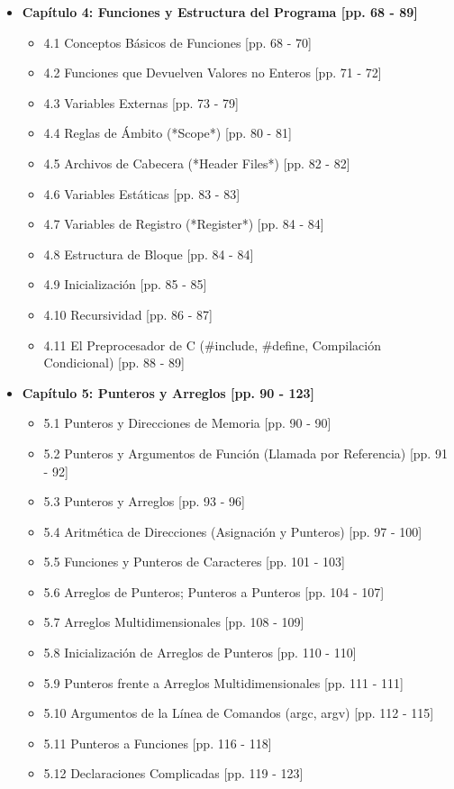 \documentclass[11pt,a4paper]{article}
\begin{document}
\begin{itemize}
    \item \textbf{Capítulo 4: Funciones y Estructura del Programa [pp. 68 - 89]}
    \begin{itemize}
        \item 4.1 Conceptos Básicos de Funciones [pp. 68 - 70]
        \item 4.2 Funciones que Devuelven Valores no Enteros [pp. 71 - 72]
        \item 4.3 Variables Externas [pp. 73 - 79]
        \item 4.4 Reglas de Ámbito (*Scope*) [pp. 80 - 81]
        \item 4.5 Archivos de Cabecera (*Header Files*) [pp. 82 - 82]
        \item 4.6 Variables Estáticas [pp. 83 - 83]
        \item 4.7 Variables de Registro (*Register*) [pp. 84 - 84]
        \item 4.8 Estructura de Bloque [pp. 84 - 84]
        \item 4.9 Inicialización [pp. 85 - 85]
        \item 4.10 Recursividad [pp. 86 - 87]
        \item 4.11 El Preprocesador de C (\#include, \#define, Compilación Condicional) [pp. 88 - 89]
    \end{itemize}

    \item \textbf{Capítulo 5: Punteros y Arreglos [pp. 90 - 123]}
    \begin{itemize}
        \item 5.1 Punteros y Direcciones de Memoria [pp. 90 - 90]
        \item 5.2 Punteros y Argumentos de Función (Llamada por Referencia) [pp. 91 - 92]
        \item 5.3 Punteros y Arreglos [pp. 93 - 96]
        \item 5.4 Aritmética de Direcciones (Asignación y Punteros) [pp. 97 - 100]
        \item 5.5 Funciones y Punteros de Caracteres [pp. 101 - 103]
        \item 5.6 Arreglos de Punteros; Punteros a Punteros [pp. 104 - 107]
        \item 5.7 Arreglos Multidimensionales [pp. 108 - 109]
        \item 5.8 Inicialización de Arreglos de Punteros [pp. 110 - 110]
        \item 5.9 Punteros frente a Arreglos Multidimensionales [pp. 111 - 111]
        \item 5.10 Argumentos de la Línea de Comandos (argc, argv) [pp. 112 - 115]
        \item 5.11 Punteros a Funciones [pp. 116 - 118]
        \item 5.12 Declaraciones Complicadas [pp. 119 - 123]
    \end{itemize}


\end{itemize}
\end{document}
